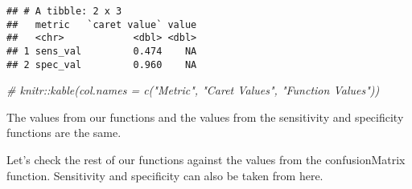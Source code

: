 \documentclass[
]{article}
\newenvironment{Shaded}{\begin{snugshade}}{\end{snugshade}}
\newcommand{\AttributeTok}[1]{\textcolor[rgb]{0.13,0.29,0.53}{#1}}
\newcommand{\CommentTok}[1]{\textcolor[rgb]{0.56,0.35,0.01}{\textit{#1}}}
\newcommand{\FunctionTok}[1]{\textcolor[rgb]{0.13,0.29,0.53}{\textbf{#1}}}
\newcommand{\NormalTok}[1]{#1}
\newcommand{\OtherTok}[1]{\textcolor[rgb]{0.56,0.35,0.01}{#1}}
\newcommand{\SpecialCharTok}[1]{\textcolor[rgb]{0.81,0.36,0.00}{\textbf{#1}}}
\newcommand{\StringTok}[1]{\textcolor[rgb]{0.31,0.60,0.02}{#1}}
\begin{document}
\begin{Shaded}
\end{Shaded}

\begin{verbatim}
## # A tibble: 2 x 3
##   metric   `caret value` value
##   <chr>            <dbl> <dbl>
## 1 sens_val         0.474    NA
## 2 spec_val         0.960    NA
\end{verbatim}

\begin{Shaded}
\begin{Highlighting}[]
 \CommentTok{\# knitr::kable(col.names = c("Metric", "Caret Values", "Function Values"))}
\end{Highlighting}
\end{Shaded}

The values from our functions and the values from the sensitivity and
specificity functions are the same.

Let's check the rest of our functions against the values from the
confusionMatrix function. Sensitivity and specificity can also be taken
from here.
\end{document}
